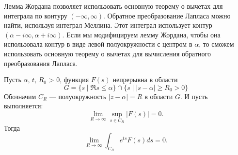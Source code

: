 \documentclass[../paper.tex]{subfile}
\begin{document}
Лемма Жордана позволяет использовать основную теорему о вычетах для интеграла по контуру $(-\infty, \infty)$.
Обратное преобразование Лапласа можно найти, используя интеграл Меллина. Этот интеграл использует контур $(\alpha - i\infty, \alpha + i\infty)$.
Если мы модифицируем лемму Жордана, чтобы она использовала контур в виде левой полуокружности с центром в $\alpha$, то сможем использовать основную теорему о вычетах для вычисления обратного преобразования Лапласа.
%
\begin{Lem}
Пусть $\alpha$, $t$, $R_0$ > 0, 
функция $F(s)$ непрерывна в области 
\[
	G = \{s \mid \Re s \le  \alpha \} \cap \{ s \mid |s-\alpha| \ge  R_0 > 0 \}
\]
Обозначим $C_R$ --- полуокружность $|z-\alpha| = R$ в области $G$.
И пусть выполняется:
\[
	\lim\limits_{R \to \infty} \sup\limits_{s \in C_R} |F(s)| = 0
.\]
Тогда
\[
	\lim_{R \to \infty} \int_{C_R} e^{ts} F(s)ds = 0
.\]
\end{Lem}
\end{document}
